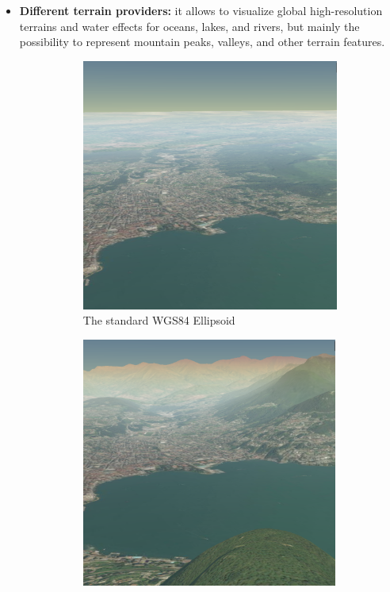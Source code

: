 \begin{itemize}
	\item {\bf Different terrain providers:} it allows to visualize global high-resolution terrains and water effects for oceans, lakes, and rivers, but mainly the possibility to represent mountain peaks, valleys, and other terrain features. 
	\begin{figure} [H]
		\centering
		\begin{subfigure}[b]{0.3\textwidth}
			\includegraphics[width=1\textwidth]{chapter2/images/2D-Map}
			\caption{The standard WGS84 Ellipsoid}
			\label{fig:2D-Map}
		\end{subfigure}
		 \qquad
		\begin{subfigure}[b]{0.3\textwidth}
			\includegraphics[width=0.993\textwidth]{chapter2/images/3D-Map}

\end{subfigure}
\end{figure}
\end{itemize}

